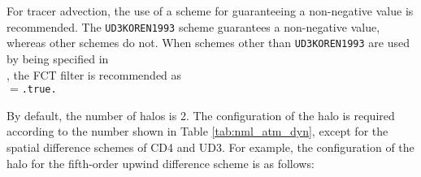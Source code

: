 For tracer advection, the use of a scheme for guaranteeing a non-negative value is recommended.
The \verb|UD3KOREN1993| scheme guarantees a non-negative value, whereas other schemes do not. When schemes other than \verb|UD3KOREN1993| are used by being specified in \\
, the FCT filter is recommended as \\
$=$\verb|.true.|

By default, the number of halos is 2. The configuration of the halo is required according to the number shown in Table \ref{tab:nml_atm_dyn}, except for the spatial difference schemes of CD4 and UD3. For example, the configuration of the halo for the fifth-order upwind difference scheme is as follows:


